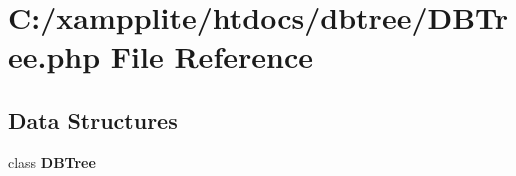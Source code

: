 \section{C:/xampplite/htdocs/dbtree/DBTree.php File Reference}
\label{_d_b_tree_8php}
\subsection*{Data Structures}
\begin{DoxyCompactItemize}
\item 
class {\bf DBTree}
\end{DoxyCompactItemize}
